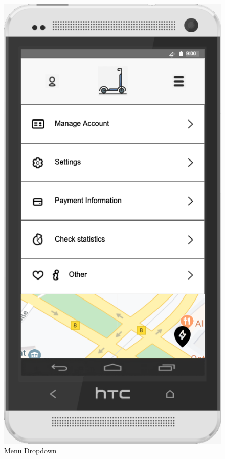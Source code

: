 \documentclass[a4paper, 12pt]{article}
\begin{document}
\begin{figure} [htbp]
  \begin{center}
    \includegraphics[scale=0.5]{images/prototypes/03-menu-dropdown.png}
  \end{center}
  \caption{Menu Dropdown}
\end{figure}
\end{document}
